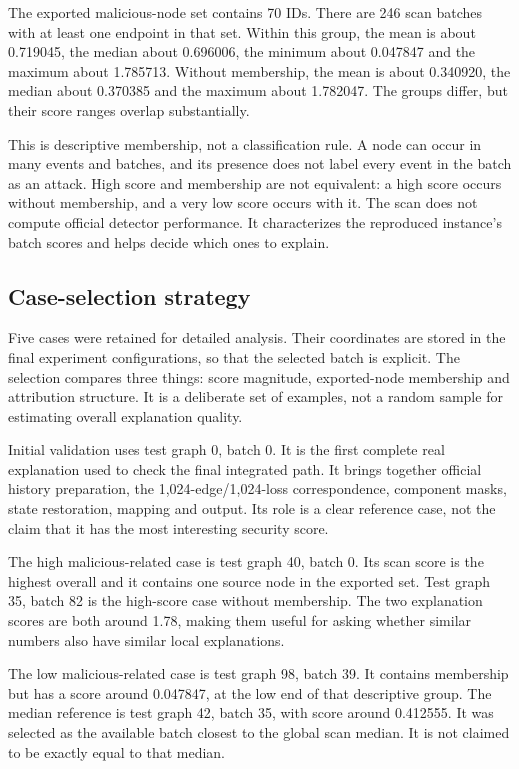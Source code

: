 \documentclass[11pt,a4paper]{article}
\begin{document}
The exported malicious-node set contains 70 IDs. There are 246 scan batches with
at least one endpoint in that set. Within this group, the mean is about 0.719045,
the median about 0.696006, the minimum about 0.047847 and the maximum about
1.785713. Without membership, the mean is about 0.340920, the median about
0.370385 and the maximum about 1.782047. The groups differ, but their score
ranges overlap substantially.

This is descriptive membership, not a classification rule. A node can occur in
many events and batches, and its presence does not label every event in the
batch as an attack. High score and membership are not equivalent: a high score
occurs without membership, and a very low score occurs with it. The scan does
not compute official detector performance. It characterizes the reproduced
instance's batch scores and helps decide which ones to explain.

\subsection{Case-selection strategy}
Five cases were retained for detailed analysis. Their coordinates are stored in
the final experiment configurations, so that the selected batch is explicit.
The selection compares three things: score magnitude, exported-node membership
and attribution structure. It is a deliberate set of examples, not a random
sample for estimating overall explanation quality.

Initial validation uses test graph 0, batch 0. It is the first complete real
explanation used to check the final integrated path. It brings together official
history preparation, the 1,024-edge/1,024-loss correspondence, component masks,
state restoration, mapping and output. Its role is a clear reference case, not
the claim that it has the most interesting security score.

The high malicious-related case is test graph 40, batch 0. Its scan score is the
highest overall and it contains one source node in the exported set. Test graph
35, batch 82 is the high-score case without membership. The two explanation
scores are both around 1.78, making them useful for asking whether similar
numbers also have similar local explanations.

The low malicious-related case is test graph 98, batch 39. It contains membership
but has a score around 0.047847, at the low end of that descriptive group. The
median reference is test graph 42, batch 35, with score around 0.412555. It was
selected as the available batch closest to the global scan median. It is not
claimed to be exactly equal to that median.
\end{document}
